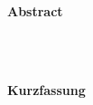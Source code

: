 \thispagestyle{noheader}
\setlength{\columnsep}{1cm}

{}

\begin{multicols}{2}
	\begin{large}
		\textbf{Abstract} \\ \\
	\end{large}
	\blindtext
	\columnbreak \\
	\begin{large}
		\textbf{Kurzfassung} \\ \\
	\end{large}
	\blindtext
\end{multicols}

\newpage